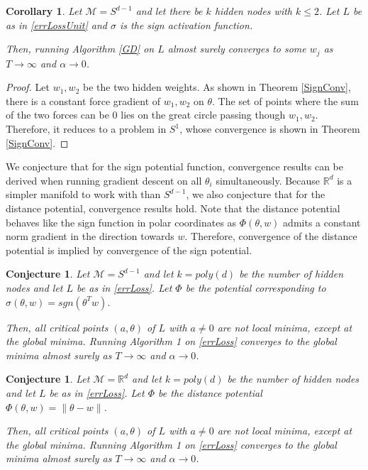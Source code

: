 \documentclass[11pt]{article}
\newtheorem{corollary}[theorem]{Corollary}
\newtheorem{conjecture}[theorem]{Conjecture}
\newcommand{\R}{{\mathbb{R}}}
\begin{document}
\begin{corollary}
\label{SignConv2}
Let $\mathcal{M} = S^{d-1}$ and let there be $k$ hidden nodes with $k\leq 2$. Let $L$ be as in \eqref{errLossUnit} and $\sigma$ is the sign activation function.

Then, running Algorithm \ref{GD} on $L$ almost surely converges to some $w_j$ as $T\to\infty$ and $\alpha \to 0$.
\end{corollary}

\begin{proof}
Let $w_1,w_2$ be the two hidden weights. As shown in Theorem \ref{SignConv}, there is a constant force gradient
of $w_1, w_2$ on $\theta$. The set of points where the sum of the two forces can be 0 lies on the great circle passing though $w_1,w_2$. Therefore, it reduces to a problem in $S^1$, whose convergence is shown in Theorem \ref{SignConv}.
\end{proof}

We conjecture that for the sign potential function, convergence results can be derived when running gradient descent on all $\theta_i$ simultaneously. Because $\R^d$ is a simpler manifold to work with than $S^{d-1}$, we also conjecture that for the distance potential, convergence results hold. Note that the distance potential behaves like the sign function in polar coordinates as $\Phi(\theta, w)$ admits a constant norm gradient in the direction towards $w$. Therefore, convergence of the distance potential is implied by convergence of the sign potential. 

\begin{conjecture}
 Let $\mathcal{M} = S^{d-1}$ and let $k = poly(d)$ be the number of hidden nodes and let $L$ be as in \eqref{errLoss}. Let $\Phi$ be the potential corresponding to $\sigma(\theta,w) = sgn(\theta^Tw)$. 
 
 Then, all critical points $(a,\theta)$ of $L$ with $a \neq 0$ are not local minima, except at the global minima. Running Algorithm 1 on \eqref{errLoss} converges to the global minima almost surely as $T\to\infty$ and $\alpha \to 0$.
\end{conjecture}

\begin{conjecture}
 Let $\mathcal{M} = \R^d$ and let $k = poly(d)$ be the number of hidden nodes and let $L$ be as in \eqref{errLoss}. Let $\Phi$ be the distance potential $\Phi(\theta,w) = \|\theta - w\|$.
 
 Then, all critical points $(a,\theta)$ of $L$ with $a \neq 0$ are not local minima, except at the global minima. Running Algorithm 1 on \eqref{errLoss} converges to the global minima almost surely as $T\to\infty$ and $\alpha \to 0$.
\end{conjecture}
\end{document}
